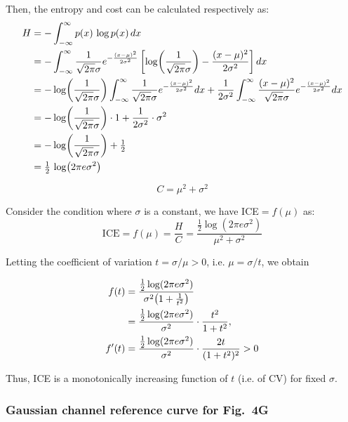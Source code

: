 \documentclass[11pt]{article}
\theoremstyle{remark}
\theoremstyle{definition}
\begin{document}
Then, the entropy and cost can be calculated respectively as: 
\begin{align}
H 
&= -\int_{-\infty}^{\infty} p(x)\,\log p(x)\, dx \notag \\
&= -\int_{-\infty}^{\infty} 
\frac{1}{\sqrt{2\pi}\sigma} 
e^{-\frac{(x-\mu)^2}{2\sigma^2}}
\left[ \log\!\left(\frac{1}{\sqrt{2\pi}\sigma}\right) 
- \frac{(x-\mu)^2}{2\sigma^2} \right] dx \notag \\
&= -\log\!\left(\frac{1}{\sqrt{2\pi}\sigma}\right) 
\int_{-\infty}^{\infty} \frac{1}{\sqrt{2\pi}\sigma} 
e^{-\frac{(x-\mu)^2}{2\sigma^2}} dx 
+ \frac{1}{2\sigma^2} 
\int_{-\infty}^{\infty} \frac{(x-\mu)^2}{\sqrt{2\pi}\sigma} 
e^{-\frac{(x-\mu)^2}{2\sigma^2}} dx \notag \\
&= -\log\!\left(\frac{1}{\sqrt{2\pi}\sigma}\right)\cdot 1 
+ \frac{1}{2\sigma^2}\cdot \sigma^2 \notag \\
&= -\log\!\left(\frac{1}{\sqrt{2\pi}\sigma}\right) + \tfrac{1}{2} \\
&= \tfrac{1}{2}\,\log\!\big(2\pi e\sigma^2\big)
\end{align}

\begin{equation}
C = \mu^2 + \sigma^2
\end{equation}


Consider the condition where $\sigma$ is a constant, we have ICE$= f(\mu)$ as:
\begin{equation}
\mathrm{ICE} = f(\mu) = \frac{H}{C}
= \frac{\tfrac{1}{2}\log(2\pi e\sigma^2)}{\mu^2+\sigma^2}
\end{equation}

Letting the coefficient of variation $t=\sigma/\mu>0$, i.e. $\mu=\sigma/t$, we obtain

\begin{align}
f(t) 
&= \frac{\tfrac{1}{2}\log(2\pi e\sigma^2)}{\sigma^2\!\left(1+\tfrac{1}{t^2}\right)} \notag \\
&= \frac{\tfrac{1}{2}\log(2\pi e\sigma^2)}{\sigma^2}\cdot \frac{t^2}{1+t^2}, \\
f'(t) 
&= \frac{\tfrac{1}{2}\log(2\pi e\sigma^2)}{\sigma^2}\cdot \frac{2t}{(1+t^2)^2} > 0
\end{align}

Thus, ICE is a monotonically increasing function of $t$ (i.e. of CV) for fixed $\sigma$.


\subsubsection{Gaussian channel reference curve for Fig.~4G}
\label{supp:gaussian_channel}
\end{document}
